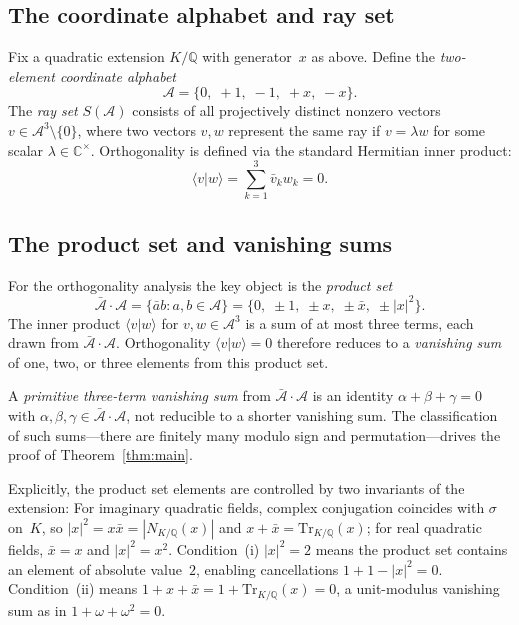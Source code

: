 \documentclass[12pt,a4paper]{article}
\newcommand{\C}{\mathbb{C}}
\newcommand{\Q}{\mathbb{Q}}
\newcommand{\Norm}[1]{N_{K/\Q}\!\left(#1\right)}
\newcommand{\Tr}[1]{\mathrm{Tr}_{K/\Q}\!\left(#1\right)}
\newcommand{\braket}[2]{\langle #1 | #2 \rangle}
\begin{document}
\subsection{The coordinate alphabet and ray set}

Fix a quadratic extension $K/\Q$ with generator~$x$ as above.  Define
the \emph{two-element coordinate alphabet}
\[
  \mathcal{A} = \{0,\; +1,\; -1,\; +x,\; -x\}.
\]
The \emph{ray set} $S(\mathcal{A})$ consists of all projectively distinct
nonzero vectors $v \in \mathcal{A}^3 \setminus \{0\}$, where two vectors
$v, w$ represent the same ray if $v = \lambda w$ for some scalar
$\lambda \in \C^\times$.  Orthogonality is defined via the standard
Hermitian inner product:
\[
  \braket{v}{w} = \sum_{k=1}^{3} \bar{v}_k w_k = 0.
\]

\subsection{The product set and vanishing sums}

For the orthogonality analysis the key object is the \emph{product set}
\[
  \bar{\mathcal{A}} \cdot \mathcal{A}
  = \{\bar{a} b : a, b \in \mathcal{A}\}
  = \{0,\; \pm 1,\; \pm x,\; \pm \bar{x},\; \pm |x|^2\}.
\]
The inner product $\braket{v}{w}$ for $v, w \in \mathcal{A}^3$ is a sum
of at most three terms, each drawn from $\bar{\mathcal{A}} \cdot
\mathcal{A}$.  Orthogonality $\braket{v}{w} = 0$ therefore reduces to a
\emph{vanishing sum} of one, two, or three elements from this product
set.

A \emph{primitive three-term vanishing sum} from
$\bar{\mathcal{A}} \cdot \mathcal{A}$ is an identity
$\alpha + \beta + \gamma = 0$ with $\alpha, \beta, \gamma \in
\bar{\mathcal{A}} \cdot \mathcal{A}$, not reducible to a shorter
vanishing sum.  The classification of such sums---there are finitely many
modulo sign and permutation---drives the proof of
Theorem~\ref{thm:main}.

Explicitly, the product set elements are controlled by two invariants of
the extension:
For imaginary quadratic fields, complex conjugation coincides with
$\sigma$ on~$K$, so $|x|^2 = x\bar{x} = |\Norm{x}|$ and $x + \bar{x}
= \Tr{x}$; for real quadratic fields, $\bar{x} = x$ and $|x|^2 = x^2$.
Condition~(i) $|x|^2 = 2$ means the product set contains an element of
absolute value~$2$, enabling cancellations $1 + 1 - |x|^2 = 0$.
Condition~(ii) means $1 + x + \bar{x} = 1 + \Tr{x} = 0$, a
unit-modulus vanishing sum as in $1 + \omega + \omega^2 = 0$.
\end{document}

